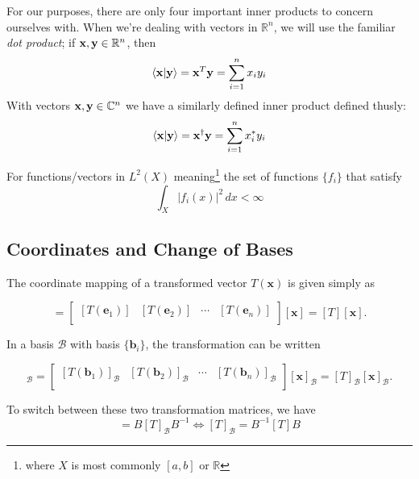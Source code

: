 \documentclass[10pt]{scrartcl}
\numberwithin{equation}{subsection}
\theoremstyle{definition}
\theoremstyle{remark}
\newcommand{\Reals}{\mathbb{R}}
\newcommand{\Complex}{\mathbb{C}}
\newcommand{\ve}[1]{
		\mathbf{#1}
	}
\newcommand{\cvb}[1]{
		[\mathbf{#1}]
	}
\newcommand{\inv}[1]{
		{#1}^{-1}
	}
\begin{document}
For our purposes, there are only four important inner products to concern
ourselves with. When we're dealing with vectors in $\Reals^n$, we will use the
familiar \textit{dot product}; if $\vb{x}, \vb{y} \in \Reals^n$, then 
\begin{equation}
	\braket{\vb{x}}{\vb{y}} = \vb{x}^T \vb{y} = \sum_{i=1}^n x_i y_i
\end{equation}
With vectors  $\vb{x}, \vb{y} \in \Complex^n$ we have a similarly defined inner
product defined thusly:
\begin{equation}
	\braket{\vb{x}}{\vb{y}} = \vb{x}^\dagger \vb{y} = \sum_{i=1}^n x_i^* y_i
\end{equation}

For functions/vectors in $L^2(X)$ meaning\footnote{where $X$ is most commonly
$[a,b]$ or $\Reals$} the set of functions $\{f_i\}$ that satisfy 
\[
	\int_X |f_i(x)|^2\, dx < \infty 
\]

\subsection{Coordinates and Change of Bases}

The coordinate mapping of a transformed vector $T(\ve{x})$ is given simply as

\begin{equation}
	[T(\ve{x})] = 
	\begin{bmatrix}
		[T(\ve{e}_1)]&[T(\ve{e}_2)]&\cdots&[T(\ve{e}_n)]\\
	\end{bmatrix}
	\cvb{x} = [T]\cvb{x}.
\end{equation}

In a basis $\mathcal{B}$ with basis $\{\ve{b}_i\}$, the transformation can be written

\begin{equation}
	[T(\ve{x})]_\mathcal{B} = 
	\begin{bmatrix}
		[T(\ve{b}_1)]_\mathcal{B}&[T(\ve{b}_2)]_\mathcal{B}&\cdots&[T(\ve{b}_n)]_\mathcal{B}\\
	\end{bmatrix}
	\cvb{x}_\mathcal{B} = [T]_\mathcal{B}\cvb{x}_\mathcal{B}.
\end{equation}

To switch between these two transformation matrices, we have
\begin{equation}
	[T]=B[T]_\mathcal{B}\inv{B} \iff [T]_\mathcal{B} = \inv{B}[T]B
\end{equation}
\end{document}
